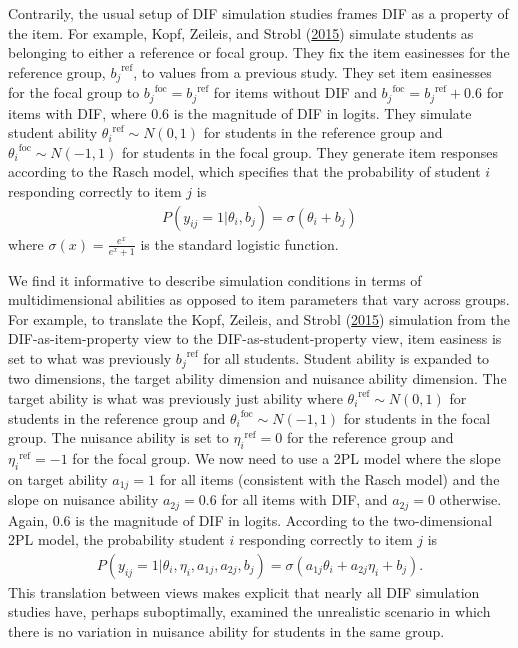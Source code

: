 \documentclass[
  11pt,
]{article}
\begin{document}
Contrarily, the usual setup of DIF simulation studies frames DIF as a property of the item. For example, Kopf, Zeileis, and Strobl (\protect\hyperlink{ref-kopf2015framework}{2015}) simulate students as belonging to either a reference or focal group. They fix the item easinesses for the reference group, \({b_j}^{\text{ref}}\), to values from a previous study. They set item easinesses for the focal group to \({b_j}^{\text{foc}} = {b_j}^{\text{ref}}\) for items without DIF and \({b_j}^{\text{foc}} = {b_j}^{\text{ref}} + 0.6\) for items with DIF, where 0.6 is the magnitude of DIF in logits. They simulate student ability \({\theta_i}^{\text{ref}} \sim N(0,1)\) for students in the reference group and \({\theta_i}^{\text{foc}} \sim N(-1,1)\) for students in the focal group. They generate item responses according to the Rasch model, which specifies that the probability of student \(i\) responding correctly to item \(j\) is
\begin{align}
    P(y_{ij} = 1 | \theta_i, b_j) = \sigma(\theta_i + b_j)
\end{align}
where \(\sigma(x) = \frac{e^x}{e^x + 1}\) is the standard logistic function.

We find it informative to describe simulation conditions in terms of multidimensional abilities as opposed to item parameters that vary across groups. For example, to translate the Kopf, Zeileis, and Strobl (\protect\hyperlink{ref-kopf2015framework}{2015}) simulation from the DIF-as-item-property view to the DIF-as-student-property view, item easiness is set to what was previously \({b_j}^{\text{ref}}\) for all students. Student ability is expanded to two dimensions, the target ability dimension and nuisance ability dimension. The target ability is what was previously just ability where \({\theta_i}^{\text{ref}} \sim N(0,1)\) for students in the reference group and \({\theta_i}^{\text{foc}} \sim N(-1,1)\) for students in the focal group. The nuisance ability is set to \({\eta_i}^{\text{ref}} = 0\) for the reference group and \({\eta_i}^{\text{ref}} = -1\) for the focal group. We now need to use a 2PL model where the slope on target ability \(a_{1j} = 1\) for all items (consistent with the Rasch model) and the slope on nuisance ability \(a_{2j} = 0.6\) for all items with DIF, and \(a_{2j} = 0\) otherwise. Again, 0.6 is the magnitude of DIF in logits. According to the two-dimensional 2PL model, the probability student \(i\) responding correctly to item \(j\) is
\begin{align}
    P(y_{ij} = 1 | \theta_i, \eta_i, a_{1j}, a_{2j}, b_j) = \sigma(a_{1j}\theta_i + a_{2j}\eta_i + b_j).
\end{align}
This translation between views makes explicit that nearly all DIF simulation studies have, perhaps suboptimally, examined the unrealistic scenario in which there is no variation in nuisance ability for students in the same group.
\end{document}
